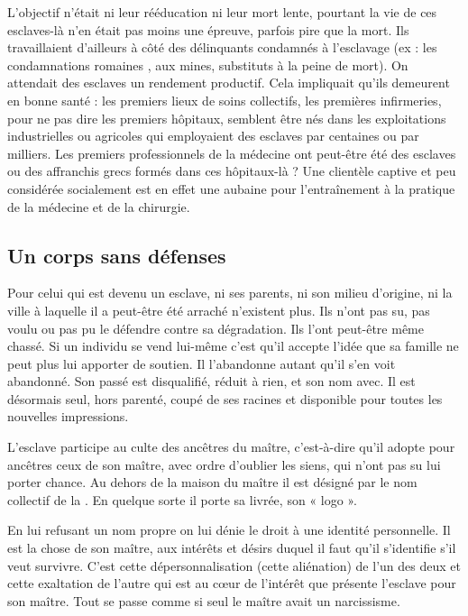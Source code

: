 L'objectif n'était ni leur rééducation ni leur mort lente, pourtant la
vie de ces esclaves-là n'en était pas moins une épreuve, parfois pire que la
mort. Ils travaillaient d'ailleurs à côté des délinquants condamnés à l'esclavage
(ex : les condamnations romaines , aux mines, substituts
à la peine de mort). On attendait des esclaves un rendement productif.
Cela impliquait qu'ils demeurent en bonne santé : les premiers lieux de
soins collectifs, les premières infirmeries, pour ne pas dire les premiers
hôpitaux, semblent être nés dans les exploitations industrielles ou agricoles
qui employaient des esclaves par centaines ou par milliers. Les premiers
professionnels de la médecine ont peut-être été des esclaves ou des
affranchis grecs formés dans ces hôpitaux-là ? Une clientèle captive et
peu considérée socialement est en effet une aubaine pour l'entraînement
à la pratique de la médecine et de la chirurgie.

\subsection{Un corps sans défenses}

Pour celui qui est devenu un esclave, ni ses parents, ni son milieu
d'origine, ni la ville à laquelle il a peut-être été arraché n'existent plus. Ils
n'ont pas su, pas voulu ou pas pu le défendre contre sa dégradation. Ils
l'ont peut-être même chassé. Si un individu se vend lui-même c'est qu'il
accepte l'idée que sa famille ne peut plus lui apporter de soutien. Il
l'abandonne autant qu'il s'en voit abandonné. Son passé est disqualifié,
réduit à rien, et son nom avec. Il est désormais seul, hors parenté, coupé
de ses racines et disponible pour toutes les nouvelles impressions.

L'esclave participe au culte des ancêtres du maître, c'est-à-dire qu'il
adopte pour ancêtres ceux de son maître, avec ordre d'oublier les siens,
qui n'ont pas su lui porter chance. Au dehors de la maison du maître il
est désigné par le nom collectif de la . En quelque sorte il porte sa
livrée, son « logo ».

En lui refusant un nom propre on lui dénie le droit à une identité
personnelle. Il est la chose de son maître, aux intérêts et désirs duquel il
faut qu'il s'identifie s'il veut survivre. C'est cette dépersonnalisation (cette
aliénation) de l'un des deux et cette exaltation de l'autre qui est au cœur
de l'intérêt que présente l'esclave pour son maître. Tout se passe comme
si seul le maître avait un narcissisme.

